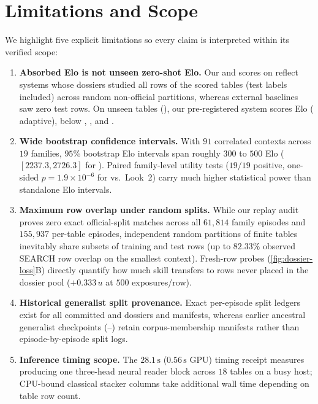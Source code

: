 \section{Limitations and Scope}
\label{sec:limitations}

We highlight five explicit limitations so every claim is interpreted within its verified scope:
\begin{enumerate}
  \item \textbf{Absorbed Elo is not unseen zero-shot Elo.} Our \BHEloGenTwoA{} and \BHEloRecall{} scores on  reflect \regrecall{} systems whose dossiers studied all rows of the scored tables (test labels included) across random non-official partitions, whereas external baselines saw zero test rows. On unseen  tables (\regfair{}), our pre-registered system scores \BHEloFairReg{} Elo (\BHEloFairAdaptive{} adaptive), below , , and .
  \item \textbf{Wide bootstrap confidence intervals.} With $91$ correlated contexts across $19$ families, $95\%$ bootstrap Elo intervals span roughly $300$ to $500$ Elo ($[2237.3, 2726.3]$ for \BHEloGenTwoA{}). Paired family-level utility tests ($19/19$ positive, one-sided $p = 1.9\times 10^{-6}$ for  vs.\ Look~2) carry much higher statistical power than standalone Elo intervals.
  \item \textbf{Maximum row overlap under random splits.} While our replay audit proves zero exact official-split matches across all $61{,}814$ family episodes and $155{,}937$ per-table episodes, independent random partitions of finite tables inevitably share subsets of training and test rows (up to $82.33\%$ observed SEARCH row overlap on the smallest context). Fresh-row probes (\cref{fig:dossier-loss}B) directly quantify how much skill transfers to rows never placed in the dossier pool ($+0.333\,u$ at $500$ exposures/row).
  \item \textbf{Historical generalist split provenance.} Exact per-episode split ledgers exist for all committed  and  dossiers and  manifests, whereas earlier ancestral generalist checkpoints (--) retain corpus-membership manifests rather than episode-by-episode split logs.
  \item \textbf{Inference timing scope.} The $28.1\,\mathrm{s}$ ($0.56\,\mathrm{s}$ GPU) timing receipt measures producing one three-head neural reader block across $18$ tables on a busy host; CPU-bound classical stacker columns take additional wall time depending on table row count.
\end{enumerate}
